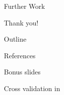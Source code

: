 \documentclass[aspectratio=169]{beamer}
\begin{document}
\begin{frame}{Further Work}
\end{frame}

\begin{frame}[standout]
	Thank you!
\end{frame}

\begin{frame}{Outline}
	\vspace{1em}
	\tableofcontents
\end{frame}
\appendix

\begin{frame}[allowframebreaks]{References}
	\printbibliography[heading=none]
\end{frame}

\begin{frame}[standout]
	Bonus slides
\end{frame}

\begin{frame}{Cross validation in \textcite{frenayParameterinsensitiveKernelExtreme2011}}
	\begin{figure}[H]
		\resizebox{0.95\textwidth}{0.9\textheight}{
			
		}
	\end{figure}
\end{frame}
\end{document}
